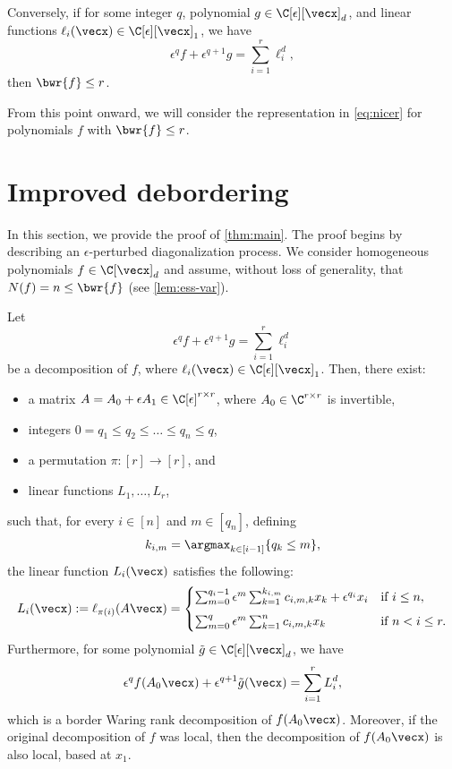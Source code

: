 \documentclass{article}
\begin{document}
Conversely, if for some integer $q$, polynomial $g \in \C[\epsilon][\vecx]_d$, and linear functions $\ell_i(\vecx) \in \C[\epsilon][\vecx]_1$, we have 
\begin{equation}\label{eq:nicer}
\epsilon^q f + \epsilon^{q+1}g = \sum_{i=1}^{r}\ell_i^d,
\end{equation}
then $\bwr{f} \leq r$. 

From this point onward, we will consider the representation in \eqref{eq:nicer} for polynomials $f$ with $\bwr{f} \leq r$.






\section{Improved debordering}

In this section, we provide the proof of \autoref{thm:main}. The proof begins by describing an $\epsilon$-perturbed diagonalization process. We consider homogeneous polynomials $f \in \C[\vecx]_d$ and assume, without loss of generality, that $N(f) = n \leq \bwr{f}$ (see \autoref{lem:ess-var}).

\begin{lemma}
Let 
\[
\epsilon^q f + \epsilon^{q+1} g = \sum_{i=1}^{r} \ell_i^d
\]
be a decomposition of $f$, where $\ell_i(\vecx) \in \C[\epsilon][\vecx]_1$. Then, there exist:
\begin{itemize}
    \item a matrix $A = A_0 + \epsilon A_1 \in \C[\epsilon]^{r \times r}$, where $A_0 \in \C^{r \times r}$ is invertible,
    \item integers $0 = q_1 \leq q_2 \leq \ldots \leq q_n \leq q$,
    \item a permutation $\pi: [r] \to [r]$, and
    \item linear functions $L_1, \ldots, L_r$,
\end{itemize}
such that, for every $i \in [n]$ and $m \in [q_n]$, defining
\[
k_{i,m} = \argmax_{k \in [i-1]} \{ q_k \leq m \},
\]
the linear function $L_i(\vecx)$ satisfies the following:
\begin{equation}\label{eq:diagonal}
    L_i(\vecx) := \ell_{\pi(i)}(A\vecx) =  
    \begin{cases}  
    \sum_{m=0}^{q_i-1} \epsilon^m \sum_{k=1}^{k_{i,m}} c_{i,m,k} x_k + \epsilon^{q_i} x_i & \text{if } i \leq n, \\[5pt]
    \sum_{m=0}^{q} \epsilon^m \sum_{k=1}^{n} c_{i,m,k} x_k & \text{if } n < i \leq r.
    \end{cases}
\end{equation}
Furthermore, for some polynomial $\tilde{g} \in \C[\epsilon][\vecx]_d$, we have
\[
\epsilon^q f(A_0\vecx) + \epsilon^{q+1} \tilde{g}(\vecx) = \sum_{i=1}^{r} L_i^d,
\]
which is a border Waring rank decomposition of $f(A_0 \vecx)$. Moreover, if the original decomposition of $f$ was local, then the decomposition of $f(A_0\vecx)$ is also local, based at $x_1$.
\end{lemma}
\end{document}
